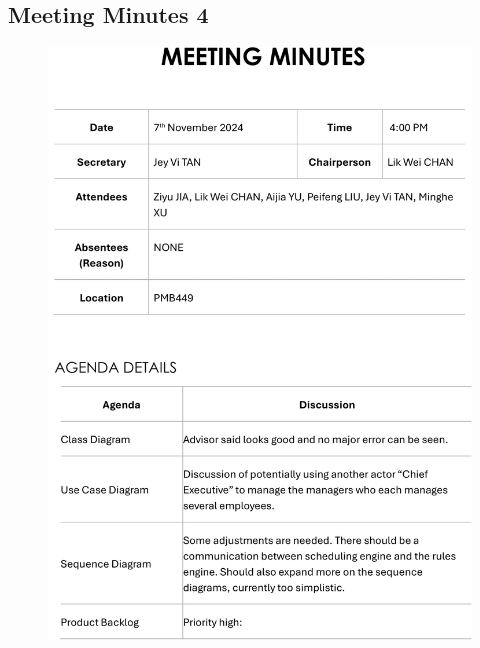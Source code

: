 \documentclass[a4paper,12pt, oneside]{report}
\begin{document}
\begin{appendices}
\section{Meeting Minutes 4}
\begin{figure}[H]
    \centering
    \includegraphics[width=\textwidth]{Minutes/Minutes_4-cropped-1.png}
\end{figure}
\newpage
\begin{figure}[H]
    \centering

\end{figure}
\end{appendices}
\end{document}
